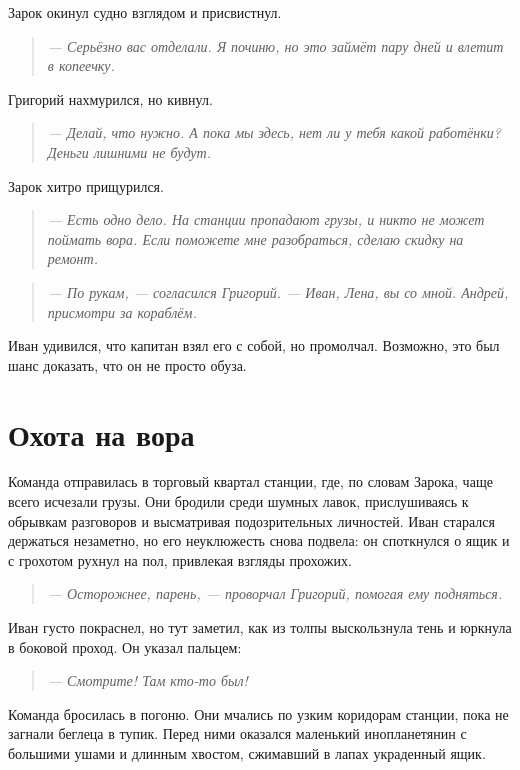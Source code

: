 \documentclass[12pt,a4paper]{book}
\newenvironment{dialogue}{\begin{quote}\itshape}{\end{quote}} %
\begin{document}
Зарок окинул судно взглядом и присвистнул.

\begin{dialogue}
--- Серьёзно вас отделали. Я починю, но это займёт пару дней и влетит в копеечку.
\end{dialogue}

Григорий нахмурился, но кивнул.

\begin{dialogue}
--- Делай, что нужно. А пока мы здесь, нет ли у тебя какой работёнки? Деньги лишними не будут.
\end{dialogue}

Зарок хитро прищурился.

\begin{dialogue}
--- Есть одно дело. На станции пропадают грузы, и никто не может поймать вора. Если поможете мне разобраться, сделаю скидку на ремонт.
\end{dialogue}

\begin{dialogue}
--- По рукам, --- согласился Григорий. --- Иван, Лена, вы со мной. Андрей, присмотри за кораблём.
\end{dialogue}

Иван удивился, что капитан взял его с собой, но промолчал. Возможно, это был шанс доказать, что он не просто обуза.

\section*{Охота на вора}

Команда отправилась в торговый квартал станции, где, по словам Зарока, чаще всего исчезали грузы. Они бродили среди шумных лавок, прислушиваясь к обрывкам разговоров и высматривая подозрительных личностей. Иван старался держаться незаметно, но его неуклюжесть снова подвела: он споткнулся о ящик и с грохотом рухнул на пол, привлекая взгляды прохожих.

\begin{dialogue}
--- Осторожнее, парень, --- проворчал Григорий, помогая ему подняться.
\end{dialogue}

Иван густо покраснел, но тут заметил, как из толпы выскользнула тень и юркнула в боковой проход. Он указал пальцем:

\begin{dialogue}
--- Смотрите! Там кто-то был!
\end{dialogue}

Команда бросилась в погоню. Они мчались по узким коридорам станции, пока не загнали беглеца в тупик. Перед ними оказался маленький инопланетянин с большими ушами и длинным хвостом, сжимавший в лапах украденный ящик.
\end{document}
